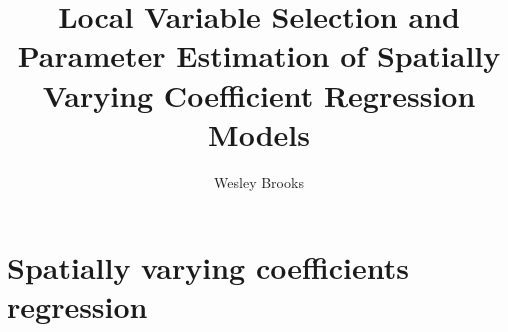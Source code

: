 \documentclass[authoryear, review, 11pt]{elsarticle}
\title{Local Variable Selection and Parameter Estimation of Spatially Varying Coefficient Regression Models}
\author{Wesley Brooks}
\date{}                                           %
\begin{document}

\maketitle



\section{Spatially varying coefficients regression \label{section:SVCR}}
\end{document}
